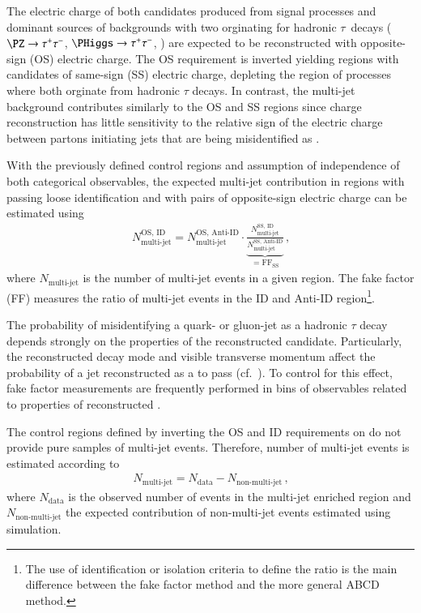 The electric charge of both \tauhadvis candidates produced from signal
processes and dominant sources of backgrounds with two \tauhadvis
orginating for hadronic $\tau$~decays ($\PZ \to \tautau$,
$\PHiggs \to \tautau$, \ttbar) are expected to be reconstructed with
opposite-sign (OS) electric charge. The OS requirement is inverted
yielding regions with \tauhadvis candidates of same-sign (SS) electric
charge, depleting the region of processes where both \tauhadvis
orginate from hadronic $\tau$ decays. In contrast, the multi-jet
background contributes similarly to the OS and SS regions since
\tauhadvis charge reconstruction has little sensitivity to the
relative sign of the electric charge between partons initiating jets
that are being misidentified as \tauhadvis.

With the previously defined control regions and assumption of
independence of both categorical observables, the expected multi-jet
contribution in regions with \tauhadvis passing loose identification
and with \tauhadvis pairs of opposite-sign electric charge can be
estimated using
\begin{align*}
  N_\text{multi-jet}^{\text{OS, ID}} =
  N_\text{multi-jet}^{\text{OS, Anti-ID}}
  \cdot
  \underbrace{\frac{N_\text{multi-jet}^{\text{SS, ID}}}
                   {N_\text{multi-jet}^{\text{SS, Anti-ID}}}}
  _{= \text{FF}_\text{SS}} \,\text{,}
  \label{eq:ff_method}
\end{align*}
where $N_\text{multi-jet}$ is the number of multi-jet events in a
given region. The fake factor (FF) measures the ratio of multi-jet
events in the ID and Anti-ID region\footnote{The use of identification
  or isolation criteria to define the ratio is the main difference
  between the fake factor method and the more general ABCD method.}.

The probability of misidentifying a quark- or gluon-jet as a hadronic
$\tau$ decay depends strongly on the properties of the reconstructed
\tauhadvis candidate. Particularly, the reconstructed decay mode and
visible transverse momentum affect the probability of a jet
reconstructed as a \tauhadvis to pass \tauid (cf.\
). To control for this effect, fake factor
measurements are frequently performed in bins of observables related
to properties of reconstructed \tauhadvis.

The control regions defined by inverting the OS and ID requirements on
\tauhadvis do not provide pure samples of multi-jet events. Therefore,
number of multi-jet events is estimated according to
\begin{align*}
  N_\text{multi-jet} = N_\text{data} - N_\text{non-multi-jet} \,\text{,}
\end{align*}
where $N_\text{data}$ is the observed number of events in the
multi-jet enriched region and $N_\text{non-multi-jet}$ the expected
contribution of non-multi-jet events estimated using simulation.



